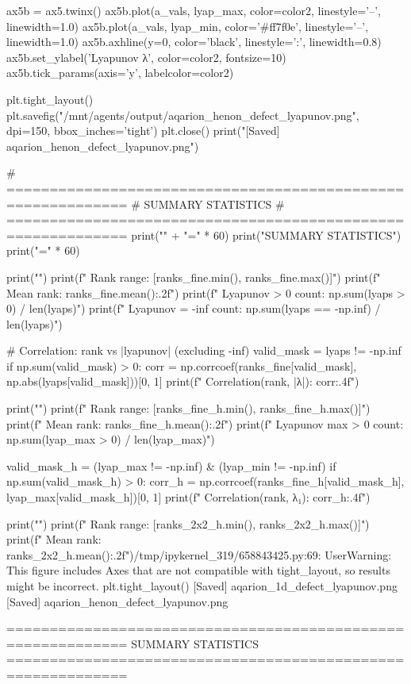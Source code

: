 {{{{{{{{{{{{{ax5b = ax5.twinx()
ax5b.plot(a_vals, lyap_max, color=color2, linestyle='--', linewidth=1.0)
ax5b.plot(a_vals, lyap_min, color='#ff7f0e', linestyle='--', linewidth=1.0)
ax5b.axhline(y=0, color='black', linestyle=':', linewidth=0.8)
ax5b.set_ylabel('Lyapunov λ', color=color2, fontsize=10)
ax5b.tick_params(axis='y', labelcolor=color2)

plt.tight_layout()
plt.savefig("/mnt/agents/output/aqarion_henon_defect_lyapunov.png", dpi=150, bbox_inches='tight')
plt.close()
print("[Saved] aqarion_henon_defect_lyapunov.png")

# ============================================================
# SUMMARY STATISTICS
# ============================================================
print("\n" + "=" * 60)
print("SUMMARY STATISTICS")
print("=" * 60)

print("")
print(f"  Rank range: [{ranks_fine.min()}, {ranks_fine.max()}]")
print(f"  Mean rank: {ranks_fine.mean():.2f}")
print(f"  Lyapunov > 0 count: {np.sum(lyaps > 0)} / {len(lyaps)}")
print(f"  Lyapunov = -inf count: {np.sum(lyaps == -np.inf)} / {len(lyaps)}")

# Correlation: rank vs |lyapunov| (excluding -inf)
valid_mask = lyaps != -np.inf
if np.sum(valid_mask) > 0:
    corr = np.corrcoef(ranks_fine[valid_mask], np.abs(lyaps[valid_mask]))[0, 1]
    print(f"  Correlation(rank, |λ|): {corr:.4f}")

print("\n[2D Hénon Map — Fine Partition (16×16 = 256 boxes)]")
print(f"  Rank range: [{ranks_fine_h.min()}, {ranks_fine_h.max()}]")
print(f"  Mean rank: {ranks_fine_h.mean():.2f}")
print(f"  Lyapunov max > 0 count: {np.sum(lyap_max > 0)} / {len(lyap_max)}")

valid_mask_h = (lyap_max != -np.inf) & (lyap_min != -np.inf)
if np.sum(valid_mask_h) > 0:
    corr_h = np.corrcoef(ranks_fine_h[valid_mask_h], lyap_max[valid_mask_h])[0, 1]
    print(f"  Correlation(rank, λ₁): {corr_h:.4f}")

print("")
print(f"  Rank range: [{ranks_2x2_h.min()}, {ranks_2x2_h.max()}]")
print(f"  Mean rank: {ranks_2x2_h.mean():.2f}")/tmp/ipykernel_319/658843425.py:69: UserWarning: This figure includes Axes that are not compatible with tight_layout, so results might be incorrect.
  plt.tight_layout()
[Saved] aqarion_1d_defect_lyapunov.png
[Saved] aqarion_henon_defect_lyapunov.png

============================================================
SUMMARY STATISTICS
============================================================

}}}}}}}}}}}}}
